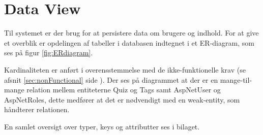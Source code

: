 \section{Data View}

Til systemet er der brug for at persistere data om brugere og indhold. For at give et overblik er opdelingen af tabeller i databasen indtegnet i et ER-diagram, som ses på figur \ref{fig:ERdiagram}.


Kardinaliteten er anført i overensstemmelse med de ikke-funktionelle krav (se afsnit \ref{sec:nonFunctional} side \pageref{sec:nonFunctional}).
Der ses på diagrammet at der er en mange-til-mange relation mellem  entiteterne Quiz og Tags samt AspNetUser og AspNetRoles, dette medfører at det er nødvendigt med en weak-entity, som håndterer relationen.


En samlet oversigt over typer, keys og attributter ses i bilaget. 


